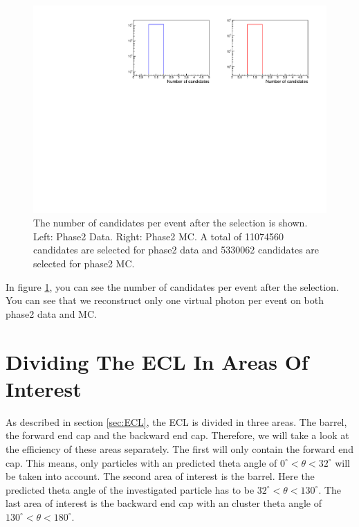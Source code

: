 \documentclass[a4paper,11pt,twosided,final,german,openbib,pdftex,listof=totoc,bibliography=totoc]{scrbook}
\begin{document}
\begin{figure}[h!]
	\includegraphics[width=\textwidth]{Bilder/CCand.pdf}
	\caption[Total Number Of Events After The Selection]{The number of candidates per event after the selection is shown. Left: Phase2 Data. Right: Phase2 MC. A total of 11074560 candidates are selected for phase2 data and 5330062 candidates are selected for phase2 MC.}
	\label{fig:nCandAS}
\end{figure}








In figure \ref{fig:nCandAS}, you can see the number of candidates per event after the selection. You can see that we reconstruct only one virtual photon per event on both phase2 data and MC.






\section{Dividing The ECL In Areas Of Interest}
\label{sec:DivECL}

As described in section \ref{sec:ECL}, the ECL is divided in three areas. The barrel, the forward end cap and the backward end cap. Therefore, we will take a look at the efficiency of these areas separately. The first will only contain the forward end cap. This means, only particles with an predicted theta angle of $0^\circ <\theta<32^\circ$ will be taken into account. The second area of interest is the barrel. Here the predicted theta angle of the investigated particle has to be $32^\circ < \theta < 130^\circ$. The last area of interest is the backward end cap with an cluster theta angle of $130^\circ <\theta < 180^\circ$.  
\end{document}
